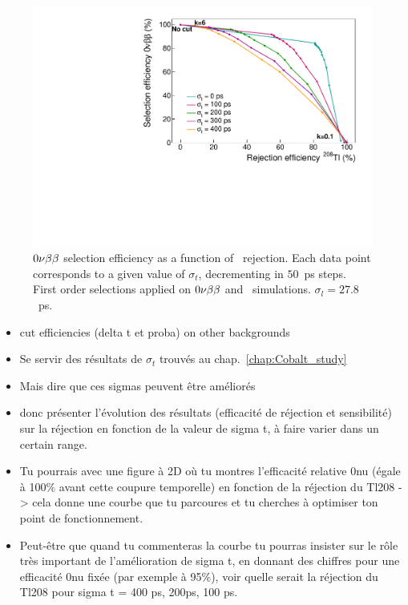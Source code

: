 \begin{figure}[!h]
  \centering
  \includegraphics[width=13cm]{timedifference/fig_timediff/compare_sigma_cut_proba.pdf}
  \caption{$0\nu\beta\beta$ selection efficiency as a function of \Tl\ rejection.
    Each data point corresponds to a given value of $\sigma_{t}$, decrementing in $50$~ps steps.
    First order selections applied on $0\nu\beta\beta$ and \Tl\ simulations.
    $\sigma_{l}=27.8$~ps.
    \label{fig:eff_cut_proba_sigma}}
\end{figure}

\begin{itemize}
\item cut efficiencies (delta t et proba) on other backgrounds
\item Se servir des résultats de $\sigma_{t}$ trouvés au chap.~\ref{chap:Cobalt_study}
\item Mais dire que ces sigmas peuvent être améliorés
\item donc présenter l'évolution des résultats (efficacité de réjection et sensibilité) sur la réjection en fonction de la valeur de sigma t, à faire varier dans un certain range.
\item Tu pourrais avec une figure à 2D où tu montres l'efficacité relative 0nu (égale à 100\% avant cette coupure temporelle) en fonction de la réjection du Tl208 -> cela donne une courbe que tu parcoures et tu cherches à optimiser ton point de fonctionnement.
\item Peut-être que quand tu commenteras la courbe tu pourras insister sur le rôle très important de l'amélioration de sigma t, en donnant des chiffres pour une efficacité 0nu fixée (par exemple à 95\%), voir quelle serait la réjection du Tl208 pour sigma t = 400 ps, 200ps, 100 ps.
\end{itemize}


